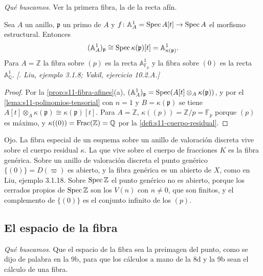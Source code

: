 \emph{Qué buscamos.} Ver la primera fibra, la de la recta afín.

\begin{ejem}
\label{ejem:s11-recta-afin}
Sea \(A\) un anillo, \(\mathfrak p\) un primo de \(A\) y \(f\colon\mathbb A_A^1=\operatorname{Spec} A[t]\to\operatorname{Spec} A\) el morfismo estructural. Entonces
\[
 (\mathbb A_A^1)_{\mathfrak p}\cong\operatorname{Spec}\kappa(\mathfrak p)[t]=\mathbb A_{\kappa(\mathfrak p)}^1.
\]
Para \(A=\mathbb Z\) la fibra sobre \((p)\) es la recta \(\mathbb A_{\mathbb F_p}^1\) y la fibra sobre \((0)\) es la recta \(\mathbb A_{\mathbb Q}^1\). \emph{[. Liu, ejemplo 3.1.8; Vakil, ejercicio 10.2.A.]}
\end{ejem}
\begin{proof}
Por la \cref{prop:s11-fibra-afines}(a), \((\mathbb A_A^1)_{\mathfrak p}=\operatorname{Spec}(A[t]\otimes_A\kappa(\mathfrak p))\), y por el \cref{lema:s11-polinomios-tensorial} con \(n=1\) y \(B=\kappa(\mathfrak p)\) se tiene \(A[t]\otimes_A\kappa(\mathfrak p)\cong\kappa(\mathfrak p)[t]\). Para \(A=\mathbb Z\), \(\kappa((p))=\mathbb Z/p=\mathbb F_p\) porque \((p)\) es máximo, y \(\kappa((0))=\operatorname{Frac}(\mathbb Z)=\mathbb Q\) por la \cref{defi:s11-cuerpo-residual}.
\end{proof}

\begin{obs}
\label{obs:s11-dos-sutilezas}
Ojo. La fibra especial de un esquema sobre un anillo de valoración discreta vive sobre el cuerpo residual \(\kappa\). La que vive sobre el cuerpo de fracciones \(K\) es la fibra genérica. Sobre un anillo de valoración discreta el punto genérico \(\{(0)\}=D(\varpi)\) es abierto, y la fibra genérica es un abierto de \(X\), como en Liu, ejemplo 3.1.18. Sobre \(\operatorname{Spec}\mathbb Z\) el punto genérico no es abierto, porque los cerrados propios de \(\operatorname{Spec}\mathbb Z\) son los \(V(n)\) con \(n\ne0\), que son finitos, y el complemento de \(\{(0)\}\) es el conjunto infinito de los \((p)\).
\end{obs}

\subsection{El espacio de la fibra}

\emph{Qué buscamos.} Que el espacio de la fibra sea la preimagen del punto, como se dijo de palabra en la 9b, para que los cálculos a mano de la 8d y la 9b sean el cálculo de una fibra.

